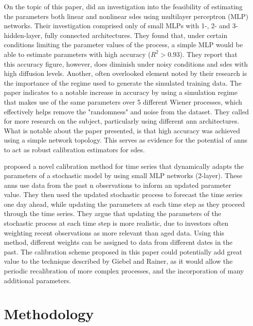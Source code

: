 \documentclass[11pt,oneside,openany,a4paper,english, report, goldenblock
]{usthesis}
\begin{document}
On the topic of this paper, \citet{Xie} did an investigation into the feasibility of estimating the parameters both linear and nonlinear \acrshort{sde}s using multilayer perceptron (MLP) networks. Their investigation comprised only of small MLPs with 1-, 2- and 3-hidden-layer, fully connected architectures. They found that, under certain conditions limiting the parameter values of the process, a simple MLP would be able to estimate parameters with high accuracy ($R^2 > 0.93$). They report that this accuracy figure, however, does diminish under noisy conditions and \acrshort{sde}s with high diffusion levels. Another, often overlooked element noted by their research is the importance of the regime used to generate the simulated training data. The paper indicates to a notable increase in accuracy by using a simulation regime that makes use of the same parameters over 5 different Wiener processes, which effectively helps remove the "randomness" and noise from the dataset. They called for more research on the subject, particularly using different \acrshort{ann} architectures. What is notable about the paper presented, is that high accuracy was achieved using a simple network topology. This serves as evidence for the potential of \acrshort{ann}s to act as robust calibration estimators for \acrshort{sde}s.


\citet{Giebel} proposed a novel calibration method for time series that dynamically adapts the parameters of a stochastic model by using small MLP networks (2-layer). These \acrshort{ann}s use data from the past n observations to inform an updated parameter value. They then used the updated stochastic process to forecast the time series one day ahead, while updating the parameters at each time step as they proceed through the time series. They argue that updating the parameters of the stochastic process at each time step is more realistic, due to investors often weighting recent observations as more relevant than aged data. Using this method, different weights can be assigned to data from different dates in the past. The calibration scheme proposed in this paper could potentially add great value to the technique described by Giebel and Rainer, as it would allow the periodic recalibration of more complex processes, and the incorporation of many additional parameters. 

\chapter{Methodology}
\label{chapter:methodology}
\end{document}
